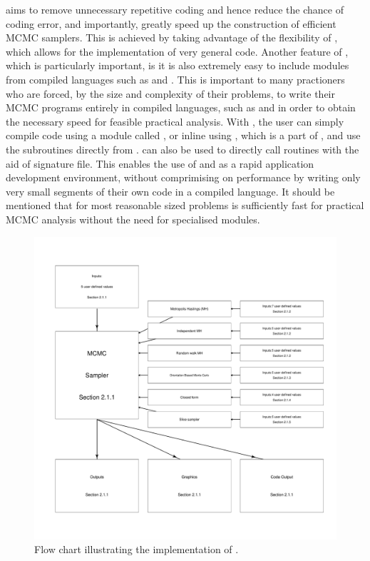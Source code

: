 \documentclass[article]{jss}
\begin{document}
 aims to remove unnecessary repetitive coding and hence
reduce the chance of coding error, and importantly, greatly speed up
the construction of efficient MCMC samplers. This is achieved by
taking advantage of the flexibility of , which allows
for the implementation of very general code. Another feature of
, which is particularly important, is it is also
extremely easy to include modules from compiled languages such as
 and . This is important to many
practioners who are forced, by the size and complexity of their
problems, to write their MCMC programs entirely in compiled languages,
such as  and  in order to obtain the
necessary speed for feasible practical analysis. With
, the user can simply compile  code
using a module called  \citep{F2PY}, or inline 
using , which is a part of  \citep{NumpyScipy},
and use the subroutines directly from . 
can also be used to directly call  routines with the aid
of  signature file. This enables the use of
 and  as a rapid application development
environment, without comprimising on performance by writing only very
small segments of their own code in a compiled language. It should be
mentioned that for most reasonable sized problems  is
sufficiently fast for practical MCMC analysis without the need for
specialised modules.

%
\begin{figure}[t!]
  \begin{center}
\hspace*{-1cm}\includegraphics[width=18cm]{flowchart.pdf}    
  \end{center}
\caption{Flow chart illustrating the implementation of .\label{fig:Flow-chart-ofPyMCMC}}

\end{figure}
\end{document}
